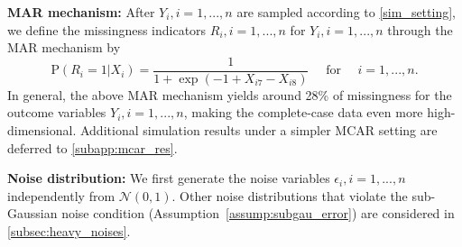 \documentclass[ejsv2,noshowframe]{imsart}
\theoremstyle{plain}
\theoremstyle{definition}
\theoremstyle{remark}
\begin{document}
{\bf MAR mechanism:} After $Y_i,i=1,...,n$ are sampled according to \eqref{sim_setting}, we define the missingness indicators $R_i,i=1,...,n$ for $Y_i,i=1,...,n$ through the MAR mechanism by 
\begin{equation}
	\label{MAR_correct}
	\mathrm{P}(R_i=1|X_i) = \frac{1}{1+\exp\left(-1+X_{i7}-X_{i8}\right)} \quad \text{ for } \quad i=1,...,n.
\end{equation}
In general, the above MAR mechanism yields around 28\% of missingness for the outcome variables $Y_i,i=1,...,n$, making the complete-case data even more high-dimensional. Additional simulation results under a simpler MCAR setting are deferred to \autoref{subapp:mcar_res}.

{\bf Noise distribution:} We first generate the noise variables $\epsilon_i,i=1,...,n$ independently from $\mathcal{N}(0,1)$. Other noise distributions that violate the sub-Gaussian noise condition (Assumption~\ref{assump:subgau_error}) are considered in \autoref{subsec:heavy_noises}. 
\end{document}
